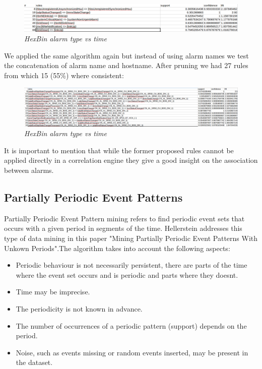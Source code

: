 \documentclass[10pt,a4paper]{article}
\begin{document}
\begin{figure}[H]
 \includegraphics[scale=0.5]{burstRulesEvName.png}
  \centering
  \caption{\textit{HexBin alarm type vs time }}
  \label{fig:EventBurst}
\end{figure}	

We applied the same algorithm again but instead of using alarm names we test the concatenation of alarm name and hostname. After pruning we had 27 rules from which 15 (55\%) where consistent:

\begin{figure}[H]
 \includegraphics[scale=0.5]{burstRulesEvNameHost.png}
  \centering
  \caption{\textit{HexBin alarm type vs time }}
  \label{fig:EventBurst}
\end{figure}	

It is important to mention that while the former proposed rules cannot be applied directly in a correlation engine they give a good insight on the association between alarms.

\subsection{Partially Periodic Event Patterns}
Partially Periodic Event Pattern mining refers to find periodic event sets that occurs with a given period in segments of the time. Hellerstein addresses this type of data mining in this paper "Mining Partially Periodic Event Patterns With Unkown Periods"\cite{PPatterns}.The algorithm takes into account the following aspects:

\begin{itemize}
\item Periodic behaviour is not necessarily persistent, there are parts of the time where the event set occurs and is periodic and parts where they doesnt.
\item Time may be imprecise.
\item The periodicity is not known in advance.
\item The number of occurrences of a periodic pattern (support) depends on the period.
\item Noise, such as events missing or random events inserted, may be present in the dataset.
\end{itemize}
\end{document}
